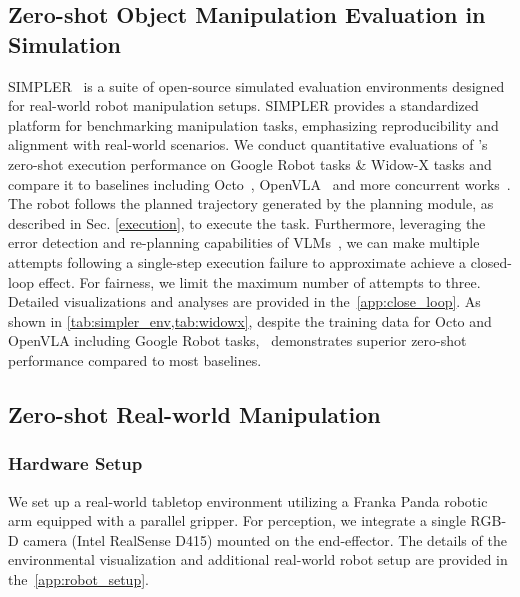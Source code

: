 

\subsection{Zero-shot Object Manipulation Evaluation in Simulation}
SIMPLER~\cite{simplerenv24} is a suite of open-source simulated evaluation environments designed for real-world robot manipulation setups. SIMPLER provides a standardized platform for benchmarking manipulation tasks, emphasizing reproducibility and alignment with real-world scenarios.
We conduct quantitative evaluations of \ours's zero-shot execution performance on Google Robot tasks \& Widow-X tasks and compare it to baselines including Octo~\cite{Octo24}, OpenVLA~\cite{OpenVLA24} and more concurrent works~\cite{robovlm25,spatialvla25}.
The robot follows the planned trajectory generated by the planning module, as described in Sec. \ref{execution}, to execute the task.
Furthermore, leveraging the error detection and re-planning capabilities of VLMs~\cite{GPT4o24,gemini23}, we can make multiple attempts following a single-step execution failure to approximate achieve a closed-loop effect. For fairness, we limit the maximum number of attempts to three. Detailed visualizations and analyses are provided in the~\cref{app:close_loop}.
As shown in \cref{tab:simpler_env,tab:widowx}, despite the training data for Octo and OpenVLA including Google Robot tasks, \ours~demonstrates superior zero-shot performance compared to most baselines.




\subsection{Zero-shot Real-world Manipulation}
\subsubsection{Hardware Setup}
We set up a real-world tabletop environment utilizing a Franka Panda robotic arm equipped with a parallel gripper. For perception, we integrate a single RGB-D camera (Intel RealSense D415) mounted on the end-effector. The details of the environmental visualization and additional real-world robot setup are provided in the~\cref{app:robot_setup}.



